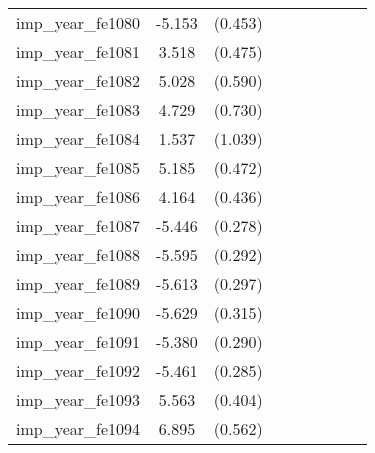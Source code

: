{\begin{tabular}{l*{4}{cc}}
imp\_year\_fe1080&   -5.153\sym{***}&  (0.453)&                  &         &                  &         &                  &         \\
imp\_year\_fe1081&    3.518\sym{***}&  (0.475)&                  &         &                  &         &                  &         \\
imp\_year\_fe1082&    5.028\sym{***}&  (0.590)&                  &         &                  &         &                  &         \\
imp\_year\_fe1083&    4.729\sym{***}&  (0.730)&                  &         &                  &         &                  &         \\
imp\_year\_fe1084&    1.537         &  (1.039)&                  &         &                  &         &                  &         \\
imp\_year\_fe1085&    5.185\sym{***}&  (0.472)&                  &         &                  &         &                  &         \\
imp\_year\_fe1086&    4.164\sym{***}&  (0.436)&                  &         &                  &         &                  &         \\
imp\_year\_fe1087&   -5.446\sym{***}&  (0.278)&                  &         &                  &         &                  &         \\
imp\_year\_fe1088&   -5.595\sym{***}&  (0.292)&                  &         &                  &         &                  &         \\
imp\_year\_fe1089&   -5.613\sym{***}&  (0.297)&                  &         &                  &         &                  &         \\
imp\_year\_fe1090&   -5.629\sym{***}&  (0.315)&                  &         &                  &         &                  &         \\
imp\_year\_fe1091&   -5.380\sym{***}&  (0.290)&                  &         &                  &         &                  &         \\
imp\_year\_fe1092&   -5.461\sym{***}&  (0.285)&                  &         &                  &         &                  &         \\
imp\_year\_fe1093&    5.563\sym{***}&  (0.404)&                  &         &                  &         &                  &         \\
imp\_year\_fe1094&    6.895\sym{***}&  (0.562)&                  &         &                  &         &                  &         \\

\end{tabular}}
